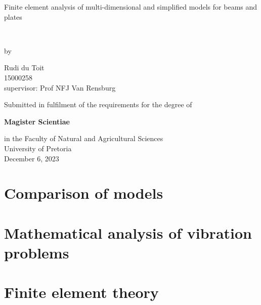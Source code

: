 \documentclass[12pt]{report}
\begin{document}
\begin{titlepage}
  \centering
  \vspace*{0.3in}
  {\Huge Finite element analysis of multi-dimensional and simplified models for beams and plates\par}
  \vspace{0.5in}\
  {\Large by\par}
  {\Large Rudi du Toit\\[0.1in]}
  {\Large 15000258 \\[0.1in]}
  {supervisor: Prof NFJ Van Rensburg \\[0.75in]}

  {Submitted in fulfilment of the requirements for the degree of\\[0.1in]}
  
  {\bfseries Magister Scientiae\\[0.1in]}
  
  {in the Faculty of Natural and Agricultural Sciences\\[0.1in]}
  {University of Pretoria\\[0.75in]}
  December 6, 2023
\end{titlepage}





\tableofcontents

\chapter{Comparison of models}\label{ch:comparison-of-models}





%

\chapter{Mathematical analysis of vibration problems}\label{ch:mathematical-analysis-of-vibration-problems}


\chapter{Finite element theory}\label{ch:finite-element-theory}


\end{document}
